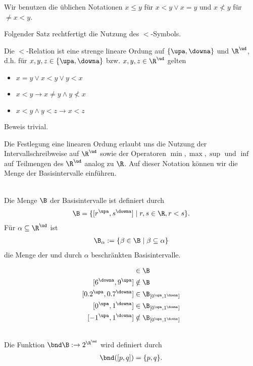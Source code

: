 Wir benutzen die üblichen Notationen $x \leq y$ für $x < y \lor x = y$ und $x \nless y$ für $\neq x < y$.

Folgender Satz rechtfertigt die Nutzung des $<$-Symbols.
%
\begin{satz}
    Die $<$-Relation ist eine strenge lineare Ordung auf $\{\upa, \downa\}$ und $\R^\ud$, d.h. für $x,y,z \in \{\upa, \downa\}$ bzw. $x,y,z \in \R^\ud$ gelten
    \begin{itemize}
        \item $x = y \lor x < y \lor y < x$
        \item $x < y \to x \neq y \land y \nless x$
        \item $x < y \land y < z \to x < z$
    \end{itemize}
\end{satz}
Beweis trivial.


Die Festlegung eine linearen Ordung erlaubt uns die Nutzung der Intervallschreibweise auf $\R^\ud$ sowie der Operatoren $\min, \max, \sup$ und $\inf$ auf Teilmengen des $\R^\ud$ analog zu $\R$. 
Auf dieser Notation können wir die Menge der Basisintervalle einführen.
%
\begin{dfn}[Basisintervalle]\ \\
    Die Menge $\B$ der Basisintervalle ist definiert durch
    \begin{align*}
        \B = \{[r^\upa, s^\downa] \mid r,s \in \R, r<s\}.
    \end{align*}
    Für $\alpha \subseteq \R^\ud$ ist
    \begin{align*}
        \B_{\alpha} := \{ \beta \in \B \mid \beta \subseteq \alpha\}
    \end{align*}
    die Menge der und durch $\alpha$ beschränkten Basisintervalle.
\end{dfn}


\begin{bsp}
 \begin{align*}
  [-3^\upa, 2^\downa] &\in \B\\
  [6^\downa,9^\upa] &\notin \B\\
  [0.2^\upa, 0.7^\downa] &\in \B_{[0^\upa, 1^\downa]}\\
  [0^\upa, 1^\downa] &\in \B_{[0^\upa, 1^\downa]}\\
  [-1^\upa,1^\downa] &\notin \B_{[0^\upa, 1^\downa]}
 \end{align*}
\end{bsp}

\begin{dfn}[Grenzen]\ \\
    Die Funktion $\bnd \B: \to 2^{\R^\ud}$ wird definiert durch
    \begin{align*}
        \bnd([p,q])=\{p,q\}.
    \end{align*}
\end{dfn}

